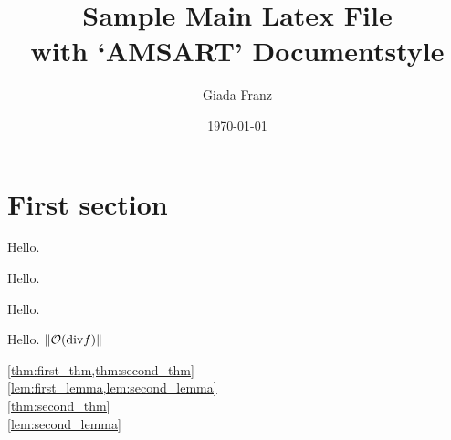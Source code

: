 \documentclass[12pt]{amsart}
\begin{document}
\title[Template of Main Latex File] %
{Sample Main Latex File\\
with `AMSART' Documentstyle}

%
\author{Giada Franz}
\address[Giada Franz]{ETH - Department of Mathematics\\
        R\"{a}mistrasse 101\\
        8092 Z\"{u}rich\\
        Switzerland}

\date{\today}


\maketitle

\section{First section}
\begin{theorem}\label{thm:first_thm}
    Hello.
\end{theorem}
\begin{theorem}\label{thm:second_thm}
    Hello.
\end{theorem}
\begin{lemma}\label{lem:first_lemma}
    Hello.
\end{lemma}
\begin{lemma}\label{lem:second_lemma}
    Hello. $\lVert\mathcal{O}(\mathrm{div} f)\rVert$
\end{lemma}
\cref{thm:first_thm,thm:second_thm}\\
\cref{lem:first_lemma,lem:second_lemma}\\
\cref{thm:second_thm}\\
\cref{lem:second_lemma}

% 
% 
\end{document}
